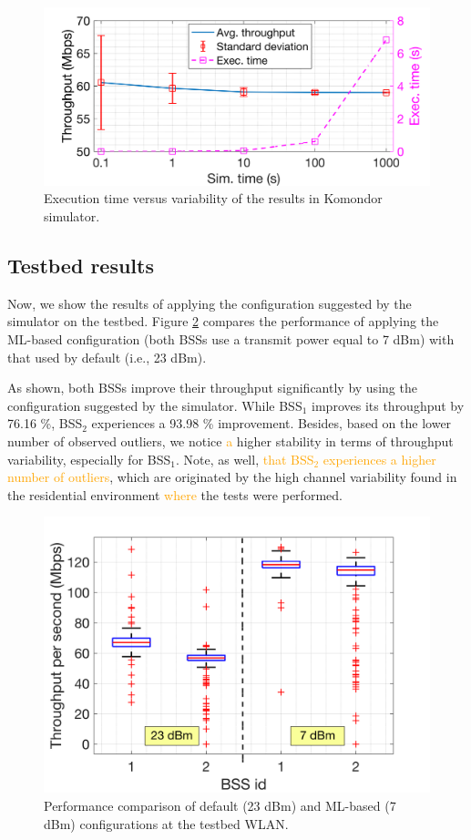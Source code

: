 \documentclass[journal]{IEEEtran}
\begin{document}
	\begin{figure}[ht!]
		\centering
		\includegraphics[width=0.9\columnwidth]{test_sim_time_vs_accuracy.png}
		\caption{Execution time versus variability of the results in Komondor simulator.}
		\label{fig:test_sim_time_vs_accuracy}
	\end{figure}

	\subsection{Testbed results}
	Now, we show the results of applying the configuration suggested by the simulator on the testbed. Figure \ref{fig:results} compares the performance of applying the ML-based configuration (both BSSs use a transmit power equal to 7 dBm) with that used by default (i.e., 23 dBm).
	
	As shown, both BSSs improve their throughput significantly by using the configuration suggested by the simulator. While BSS$_1$ improves its throughput by 76.16 \%, BSS$_2$ experiences a 93.98 \% improvement. Besides, based on the lower number of observed outliers, we notice \textcolor{orange}{a} higher stability in terms of throughput variability, especially for BSS$_1$. Note, as well, \textcolor{orange}{that BSS$_2$ experiences a higher number of outliers}, which are originated by the high channel variability found in the residential environment \textcolor{orange}{where} the tests were performed.
	\begin{figure}[ht!!!!]
		\centering
		\includegraphics[width=0.8\columnwidth]{boxplotbps.png}
		\caption{Performance comparison of default (23 dBm) and ML-based (7 dBm) configurations at the testbed WLAN.}
		\label{fig:results}
	\end{figure}
	
\end{document}
